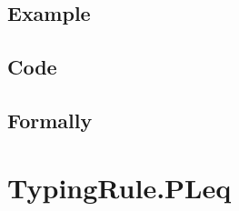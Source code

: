 \documentclass{book}
\begin{document}
  \subsection{Example}

  \subsection{Code}

\begin{emptyformal}
    \subsection{Formally}
\end{emptyformal}


 \section{TypingRule.PLeq \label{sec:TypingRule.PLeq}}
\end{document}
